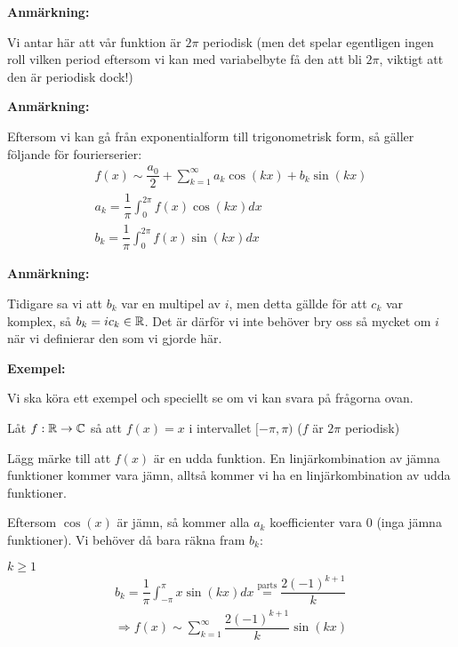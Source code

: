 \noindent\textbf{Anmärkning:}\par
\noindent Vi antar här att vår funktion är $2\pi$ periodisk (men det spelar egentligen ingen roll vilken period eftersom vi kan med variabelbyte få den att bli $2\pi$, viktigt att den är periodisk dock!)
\par\bigskip
\noindent\textbf{Anmärkning:}\par
\noindent Eftersom vi kan gå från exponentialform till trigonometrisk form, så gäller följande för fourierserier:
\begin{equation*}
  \begin{gathered}
    f(x)\sim \dfrac{a_0}{2}+\sum_{k=1}^{\infty}a_k\cos(kx)+b_k\sin(kx)\\
    a_k = \dfrac{1}{\pi}\int_{0}^{2\pi}f(x)\cos(kx)dx\\
    b_k = \dfrac{1}{\pi}\int_{0}^{2\pi}f(x)\sin(kx)dx
  \end{gathered}
\end{equation*}
\par\bigskip
\noindent\textbf{Anmärkning:}\par
\noindent Tidigare sa vi att $b_k$ var en multipel av $i$, men detta gällde för att $c_k$ var komplex, så $b_k = ic_k\in\mathbb{R}$. Det är därför vi inte behöver bry oss så mycket om $i$ när vi definierar den som vi gjorde här.
\par\bigskip
\noindent\textbf{Exempel:}\par
\noindent Vi ska köra ett exempel och speciellt se om vi kan svara på frågorna ovan.
\par\bigskip
\noindent Låt $f:\mathbb{R}\to\mathbb{C}$ så att $f(x) = x$ i intervallet $[-\pi,\pi)$ ($f$ är $2\pi$ periodisk)
\par\bigskip
\noindent Lägg märke till att $f(x)$ är en udda funktion. En linjärkombination av jämna funktioner kommer vara jämn, alltså kommer vi ha en linjärkombination av udda funktioner.\par
\noindent Eftersom $\cos(x)$ är jämn, så kommer alla $a_k$ koefficienter vara 0 (inga jämna funktioner). Vi behöver då bara räkna fram $b_k$:\par
$k\geq1$
\begin{equation*}
  \begin{gathered}
    b_k = \dfrac{1}{\pi}\int_{-\pi}^{\pi}x\sin(kx)dx \stackrel{\text{parts}}{=} \dfrac{2(-1)^{k+1}}{k}\\
    \Rightarrow f(x)\sim\sum_{k=1}^{\infty}\dfrac{2(-1)^{k+1}}{k}\sin(kx)
  \end{gathered}
\end{equation*}
